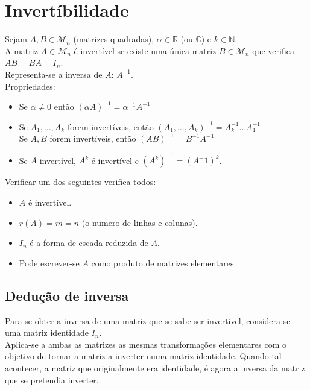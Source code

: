\documentclass[]{report}
\begin{document}
\section{Invertíbilidade}
Sejam $A, B \in \mathcal{M}_{n}$ (matrizes quadradas), $\alpha \in \mathbb{R}$ 
(ou $\mathbb{C}$) e $k \in \mathbb{N}$.\\
A matriz $A \in \mathcal{M}_{n}$ é invertível se existe uma única matriz $B \in \mathcal{M}_{n}$ que verifica $AB = BA = I_n$.\\
Representa-se a inversa de $A$: $A^{-1}$.\\[0.2cm]
Propriedades:
\begin{itemize}
\item Se $\alpha \neq 0$ então $(\alpha A)^{-1} = \alpha^{-1}A^{-1}$
\item Se $A_1, \dots, A_{k}$ forem invertíveis, então $(A_1, \dots, A_k)^{-1} = A_k^{-1} \dots A_1^{-1}$\\
\indent Se $A,B$ forem invertíveis, então $(AB)^{-1} = B^{-1} A^{-1}$
\item Se $A$ invertível, $A^k$ é invertível e $(A^k)^{-1} = (A^-1)^k$.
\end{itemize}
Verificar um dos seguintes verifica todos:
\begin{itemize}
\item $A$ é invertível.
\item $r(A) = m = n$ (o numero de linhas e colunas).
\item $I_n$ é a forma de escada reduzida de $A$.
\item Pode escrever-se $A$ como produto de matrizes elementares.
\end{itemize}
\subsection{Dedução de inversa}
Para se obter a inversa de uma matriz que se sabe ser invertível, considera-se uma matriz identidade $I_n$.\\
Aplica-se a ambas as matrizes as mesmas transformações elementares com o objetivo de tornar a matriz a inverter numa matriz identidade. Quando tal acontecer, a matriz que originalmente era identidade, é agora  a inversa da matriz que se pretendia inverter.
\end{document}
